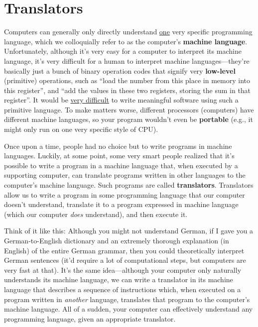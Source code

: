 \documentclass{article}
\begin{document}
\section{Translators}

Computers can generally only directly understand \ul{one} very specific programming language, which we colloquially refer to as the computer's \textbf{machine language}. Unfortunately, although it's very easy for a computer to interpret its machine language, it's very difficult for a human to interpret machine languages---they're basically just a bunch of binary operation codes that signify very \textbf{low-level} (primitive) operations, such as ``load the number from this place in memory into this register'', and ``add the values in these two registers, storing the sum in that register''. It would be \ul{very difficult} to write meaningful software using such a primitive language. To make matters worse, different processors (computers) have different machine languages, so your program wouldn't even be \textbf{portable} (e.g., it might only run on one very specific style of CPU).

Once upon a time, people had no choice but to write programs in machine languages. Luckily, at some point, some very smart people realized that it's possible to write a program in a machine language that, when executed by a supporting computer, can translate programs written in other languages to the computer's machine language. Such programs are called \textbf{translators}. Translators allow us to write a program in some programming language that our computer doesn't understand, translate it to a program expressed in machine language (which our computer \textit{does} understand), and then execute it.

Think of it like this: Although you might not understand German, if I gave you a German-to-English dictionary and an extremely thorough explanation (in English) of the entire German grammar, then you could theoretically interpret German sentences (it'd require a lot of computational steps, but computers are very fast at that). It's the same idea---although your computer only naturally understands its machine language, we can write a translator in its machine language that describes a sequence of instructions which, when executed on a program written in \textit{another} language, translates that program to the computer's machine language. All of a sudden, your computer can effectively understand any programming language, given an appropriate translator.
\end{document}
